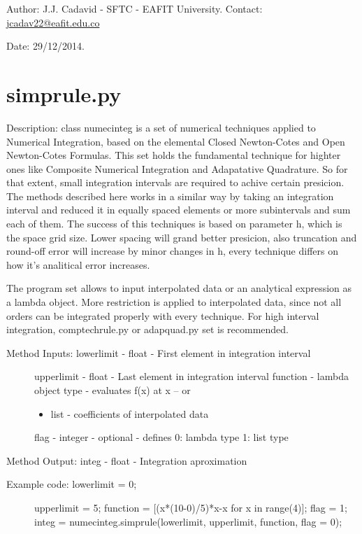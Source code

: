 \documentclass[letterpaper,10pt,oneside]{sphinxmanual}
\theoremstyle{plain}%
\theoremstyle{definition}%
\theoremstyle{remark}%
\begin{document}
Author: J.J. Cadavid - SFTC - EAFIT University.
Contact: \href{mailto:jcadav22@eafit.edu.co}{jcadav22@eafit.edu.co}

Date: 29/12/2014.


\section{simprule.py}
\label{code:simprule-py}\label{code:module-simprule}
Description: class numecinteg is a set of numerical techniques applied to
Numerical Integration, based on the elemental Closed Newton-Cotes and
Open Newton-Cotes Formulas. This set holds the fundamental technique for
highter ones like Composite Numerical Integration and Adapatative Quadrature.
So for that extent, small integration intervals are required to achive certain
presicion. The methods described here works in a similar way by taking an
integration interval and reduced it in equally spaced elements or more 
subintervals and sum each of them. The success of this techniques is based
on parameter h, which is the space grid size. Lower spacing will grand better
presicion, also truncation and round-off error will increase by minor changes
in h, every technique differs on how it's analitical error increases.

The program set allows to input interpolated data or an analytical expression
as a lambda object. More restriction is applied to interpolated data, since
not all orders can be integrated properly with every technique. For high 
interval integration, comptechrule.py or adapquad.py set is recommended.
\begin{description}
\item[{Method Inputs: lowerlimit - float - First element in integration interval}] \leavevmode
upperlimit - float - Last element in integration interval
function - lambda object type - evaluates f(x) at x -- or
\begin{itemize}
\item {} 
list - coefficients of interpolated data

\end{itemize}

flag - integer - optional - defines 0: lambda type 1: list type

\end{description}

Method Output: integ - float - Integration aproximation
\begin{description}
\item[{Example code: lowerlimit = 0;}] \leavevmode
upperlimit = 5;
function = {[}(x*(10-0)/5)*x-x for x in range(4){]};
flag = 1;
integ =                   numecinteg.simprule(lowerlimit, upperlimit, function, flag = 0);

\end{description}
\end{document}
